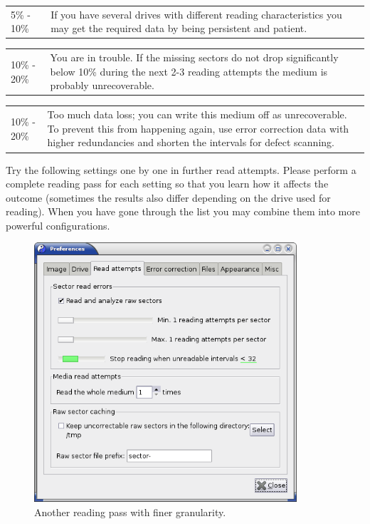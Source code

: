\vspace*{-1mm}

\colorbox{ltyellow}{
  \begin{tabular}{p{30mm}p{118mm}}
    5\% - 10\% &
    If you have several drives with different reading characteristics
    you may get the required data by being persistent and patient. \\
\end{tabular}}

\vspace*{-1mm}

\colorbox{ltorange}{
  \begin{tabular}{p{30mm}p{118mm}}
    10\% - 20\% &
    You are in trouble. If the missing sectors do not drop significantly
    below 10\% during the next 2-3 reading attempts the medium is probably
    unrecoverable. \\
\end{tabular}}

\vspace*{-1mm}

\colorbox{ltred}{
  \begin{tabular}{p{30mm}p{118mm}}
    10\% - 20\% &
    Too much data loss; you can write this medium off as unrecoverable.
    To prevent this from happening again, use error correction data
    with higher redundancies and shorten the intervals for defect scanning.  \\
\end{tabular}}

Try the following settings one by one in further read attempts. Please
perform a complete reading pass for each setting so that you learn how
it affects the outcome (sometimes the results also differ depending on
the drive used for reading). When you have gone through the list you may
combine them into more powerful configurations. 

\begin{figure}[h]
\centerline{\includegraphics[width=0.87\textwidth]{screenshots/fix-prefs-read-attempts-adv1.png}}
\caption{Another reading pass with finer granularity.}  
\label{howto-recover-read-attempts-finer}
\end{figure}

